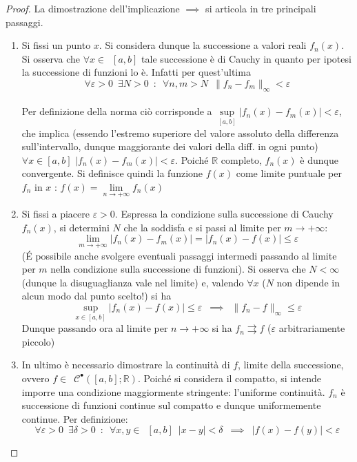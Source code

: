 \documentclass[10pt, oneside]{book}
\theoremstyle{plain}
\begin{document}
\begin{proof}
La dimostrazione dell'implicazione $\implies$ si articola in tre principali passaggi.
\begin{enumerate}
\item Si fissi un punto $x$. Si considera dunque la successione a valori reali $f_n(x)$. Si osserva che $\forall x \in \enspace [a,b]$ tale successione è di Cauchy in quanto per ipotesi la successione di funzioni lo è. Infatti per quest'ultima
\[\forall \varepsilon > 0 \enspace \exists N > 0 \enspace : \enspace \forall n,m > N \enspace \|f_n - f_m\|_\infty < \varepsilon\]
\\Per definizione della norma ciò corrisponde a $\displaystyle \sup\limits_{[a,b]}|f_n(x) - f_m(x)| < \varepsilon$, che implica (essendo l'estremo superiore del valore assoluto della differenza sull'intervallo, dunque maggiorante dei valori della diff. in ogni punto) $\forall x \in [a,b]$ $|f_n(x) - f_m(x)| < \varepsilon$. Poiché $\mathbb{R}$ completo, $f_n(x)$ è dunque convergente. Si definisce quindi la funzione $f(x)$ come limite puntuale per $f_n$ in $x$ : $\displaystyle f(x) = \lim\limits_{n \rightarrow +\infty} f_n(x)$
\item Si fissi a piacere $\varepsilon > 0$. Espressa la condizione sulla successione di Cauchy $f_n(x)$, si determini $N$ che la soddisfa e si passi al limite per $m \rightarrow + \infty$:
\[\lim\limits_{m \rightarrow +\infty}|f_n(x) - f_m(x)| = |f_n(x) - f(x)| \leq \varepsilon\]
(\'E possibile anche svolgere eventuali passaggi intermedi passando al limite per $m$ nella condizione sulla successione di funzioni). Si osserva che $N < \infty$ (dunque la disuguaglianza vale nel limite) e, valendo $\forall x$ ($N$ non dipende in alcun modo dal punto scelto!) si ha
\[\sup\limits_{\displaystyle x \in [a,b]}|f_n(x) - f(x)| \leq \varepsilon \enspace \implies \enspace \|f_n - f\|_\infty \leq \varepsilon\]
Dunque passando ora al limite per $n \rightarrow +\infty$ si ha $f_n \rightrightarrows f$ ($\varepsilon$ arbitrariamente piccolo)
\item In ultimo è necessario dimostrare la continuità di $f$, limite della successione, ovvero $f \in \enspace \mathcal{C}^{•}([a,b] ; \mathbb{R})$. Poiché si considera il compatto, si intende imporre una condizione maggiormente stringente: l'uniforme continuità. $f_n$ è successione di funzioni continue sul compatto e dunque uniformemente continue. Per definizione:
\[\forall \varepsilon > 0 \enspace \exists \delta > 0 \enspace : \enspace \forall x, y \in \enspace [a,b] \enspace |x - y| < \delta \enspace \implies \enspace |f(x) - f(y)| < \varepsilon\]

\end{enumerate}
\end{proof}
\end{document}
